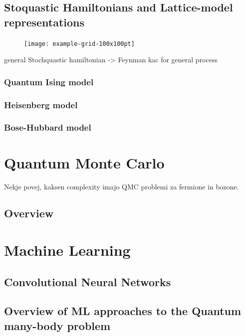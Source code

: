 \subsection{Stoquastic Hamiltonians and Lattice-model representations}
\label{subsec:fk-latt}
\begin{figure}[h]
	\centering
	\texttt{[image: example-grid-100x100pt]}
\end{figure}

general Stochquastic hamiltonian -> Feynman kac for general process

\subsubsection{Quantum Ising model}
\subsubsection{Heisenberg model}
\subsubsection{Bose-Hubbard model}


\newpage
\section{Quantum Monte Carlo}
\label{sec:qmc}

Nekje povej, kaksen complexity imajo QMC problemi za fermione in bozone. 

\subsection{Overview}
\label{subsec:qmc-overview}

\newpage
\section{Machine Learning}
\label{sec:ml}

\subsection{Convolutional Neural Networks}
\label{subsec:ml-cnn}

\subsection{Overview of ML approaches to the Quantum many-body problem}
\label{subsec:ml-overview}
